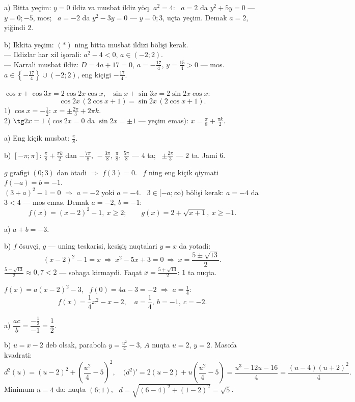 a) Bitta yeçim: $y=0$ ildiz va musbat ildiz yöq. $a^2=4$: \ $a=2$ da $y^2+5y=0$ — $y=0;-5$, mos; \ $a=-2$ da $y^2-3y=0$ — $y=0;3$, uçta yeçim. Demak $a=2$, yiğindi $2$.

b) Ikkita yeçim: $(*)$ ning bitta musbat ildizi bölişi kerak.\\
— Ildizlar har xil işorali: $a^2-4<0$, $a\in(-2;2)$.\\
— Karrali musbat ildiz: $D=4a+17=0$, $a=-\frac{17}4$, $y=\frac{15}4>0$ — mos.\\
$a\in\left\{-\frac{17}4\right\}\cup(-2;2)$, eng kiçigi $-\frac{17}4$.

\newpage
{}
$\cos x+\cos3x=2\cos2x\cos x$, \ $\sin x+\sin3x=2\sin2x\cos x$:
\[\cos2x\,(2\cos x+1)=\sin2x\,(2\cos x+1).\]
1) $\cos x=-\frac12$: $x=\pm\frac{2\pi}3+2\pi k$.\\
2) $\tg2x=1$ ($\cos2x=0$ da $\sin2x=\pm1$ — yeçim emas): $x=\frac\pi8+\frac{\pi k}2$.

a) Eng kiçik musbat: $\frac\pi8$.

b) $[-\pi;\pi]$: $\frac\pi8+\frac{\pi k}2$ dan $-\frac{7\pi}8,\,-\frac{3\pi}8,\,\frac\pi8,\,\frac{5\pi}8$ — $4$ ta; \ $\pm\frac{2\pi}3$ — $2$ ta. Jami $6$.

\newpage
{}
$g$ grafigi $(0;3)$ dan ötadi $\Rightarrow$ $f(3)=0$. \ $f$ ning eng kiçik qiymati $f(-a)=b=-1$.\\
$(3+a)^2-1=0$ $\Rightarrow$ $a=-2$ yoki $a=-4$. \ $3\in[-a;\infty)$ bölişi kerak: $a=-4$ da $3<4$ — mos emas. Demak $a=-2$, $b=-1$:
\[f(x)=(x-2)^2-1,\ x\ge2;\qquad g(x)=2+\sqrt{x+1},\ x\ge-1.\]

a) $a+b=-3$.

b) $f$ ösuvçi, $g$ — uning teskarisi, kesişiş nuqtalari $y=x$ da yotadi:
\[(x-2)^2-1=x\ \Rightarrow\ x^2-5x+3=0\ \Rightarrow\ x=\frac{5\pm\sqrt{13}}2.\]
$\frac{5-\sqrt{13}}2\approx0{,}7<2$ — sohaga kirmaydi. Faqat $x=\frac{5+\sqrt{13}}2$: $1$ ta nuqta.

\newpage
{}
$f(x)=a(x-2)^2-3$, \ $f(0)=4a-3=-2$ $\Rightarrow$ $a=\frac14$:
\[f(x)=\frac14x^2-x-2,\quad a=\frac14,\ b=-1,\ c=-2.\]

a) $\dfrac{ac}b=\dfrac{-\frac12}{-1}=\dfrac12$.

b) $u=x-2$ deb olsak, parabola $y=\frac{u^2}4-3$, $A$ nuqta $u=2$, $y=2$. Masofa kvadrati:
\[d^2(u)=(u-2)^2+\left(\frac{u^2}4-5\right)^2,\quad \bigl(d^2\bigr)'=2(u-2)+u\left(\frac{u^2}4-5\right)=\frac{u^3-12u-16}4=\frac{(u-4)(u+2)^2}4.\]
Minimum $u=4$ da: nuqta $(6;1)$, \ $d=\sqrt{(6-4)^2+(1-2)^2}=\sqrt5$.

